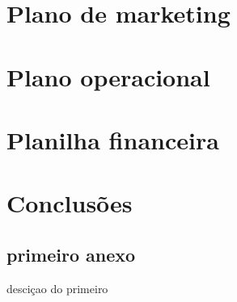\documentclass[
	12pt,				%
	openright,			%
	oneside,			%
	a4paper,			%
	english,			%
	french,				%
	spanish,			%
	brazil,				%
	oldfontcommands
	]{abntex2}
\begin{document}
\chapter[Plano de marketing]{Plano de marketing}

\chapter[Plano operacional]{Plano operacional}

\chapter[Planilha financeira]{Planilha financeira}

\chapter[Conclusões]{Conclusões}





\begin{anexosenv}

\partanexos

\chapter{primeiro anexo}
desciçao do primeiro 

\end{anexosenv}



% 









\printindex
\end{document}
